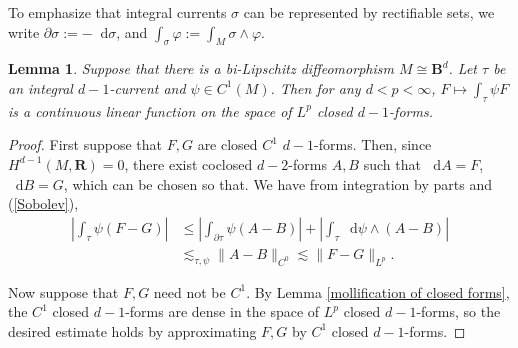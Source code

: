 \documentclass[reqno,11pt]{amsart}
\newcommand{\RR}{\mathbf{R}}
\newcommand{\Ball}{\mathbf{B}}
\newcommand*\dif{\mathop{}\!\mathrm{d}}
\newtheorem{lemma}[theorem]{Lemma}
\theoremstyle{definition}
\numberwithin{equation}{section}
\begin{document}
To emphasize that integral currents $\sigma$ can be represented by rectifiable sets, we write $\partial \sigma := -\dif \sigma$, and $\int_\sigma \varphi := \int_M \sigma \wedge \varphi$.

\begin{lemma}\label{local trace theorem}
Suppose that there is a bi-Lipschitz diffeomorphism $M \cong \Ball^d$.
Let $\tau$ be an integral $d - 1$-current and $\psi \in C^1(M)$.
Then for any $d < p < \infty$, $F \mapsto \int_\tau \psi F$ is a continuous linear function on the space of $L^p$ closed $d - 1$-forms.
\end{lemma}
\begin{proof}
First suppose that $F, G$ are closed $C^1$ $d - 1$-forms.
Then, since $H^{d - 1}(M, \RR) = 0$, there exist coclosed $d - 2$-forms $A, B$ such that $\dif A = F$, $\dif B = G$, which can be chosen so that.
We have from integration by parts and (\ref{Sobolev}),
\begin{align*}
	\left|\int_\tau \psi(F - G)\right| 
	&\leq \left|\int_{\partial \tau} \psi (A - B)\right| + \left|\int_\tau \dif \psi \wedge (A - B)\right| \\
	&\lesssim_{\tau, \psi} \|A - B\|_{C^0} \lesssim \|F - G\|_{L^p}.
\end{align*}

Now suppose that $F, G$ need not be $C^1$.
By Lemma \ref{mollification of closed forms}, the $C^1$ closed $d - 1$-forms are dense in the space of $L^p$ closed $d - 1$-forms, so the desired estimate holds by approximating $F, G$ by $C^1$ closed $d - 1$-forms.
\end{proof}
\end{document}
